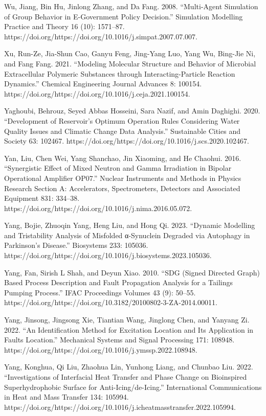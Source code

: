 \documentclass[utf8]{gradu3}
\begin{document}
Wu, Jiang, Bin Hu, Jinlong Zhang, and Da Fang. 2008. “Multi-Agent Simulation of Group Behavior in E-Government Policy Decision.” Simulation Modelling Practice and Theory 16 (10): 1571–87. https://doi.org/https://doi.org/10.1016/j.simpat.2007.07.007.

Xu, Run-Ze, Jia-Shun Cao, Ganyu Feng, Jing-Yang Luo, Yang Wu, Bing-Jie Ni, and Fang Fang. 2021. “Modeling Molecular Structure and Behavior of Microbial Extracellular Polymeric Substances through Interacting-Particle Reaction Dynamics.” Chemical Engineering Journal Advances 8: 100154. https://doi.org/https://doi.org/10.1016/j.ceja.2021.100154.

Yaghoubi, Behrouz, Seyed Abbas Hosseini, Sara Nazif, and Amin Daghighi. 2020. “Development of Reservoir’s Optimum Operation Rules Considering Water Quality Issues and Climatic Change Data Analysis.” Sustainable Cities and Society 63: 102467. https://doi.org/https://doi.org/10.1016/j.scs.2020.102467.

Yan, Liu, Chen Wei, Yang Shanchao, Jin Xiaoming, and He Chaohui. 2016. “Synergistic Effect of Mixed Neutron and Gamma Irradiation in Bipolar Operational Amplifier OP07.” Nuclear Instruments and Methods in Physics Research Section A: Accelerators, Spectrometers, Detectors and Associated Equipment 831: 334–38. https://doi.org/https://doi.org/10.1016/j.nima.2016.05.072.

Yang, Bojie, Zhuoqin Yang, Heng Liu, and Hong Qi. 2023. “Dynamic Modelling and Tristability Analysis of Misfolded α-Synuclein Degraded via Autophagy in Parkinson’s Disease.” Biosystems 233: 105036. https://doi.org/https://doi.org/10.1016/j.biosystems.2023.105036.

Yang, Fan, Sirish L Shah, and Deyun Xiao. 2010. “SDG (Signed Directed Graph) Based Process Description and Fault Propagation Analysis for a Tailings Pumping Process.” IFAC Proceedings Volumes 43 (9): 50–55. https://doi.org/https://doi.org/10.3182/20100802-3-ZA-2014.00011.

Yang, Jinsong, Jingsong Xie, Tiantian Wang, Jinglong Chen, and Yanyang Zi. 2022. “An Identification Method for Excitation Location and Its Application in Faults Location.” Mechanical Systems and Signal Processing 171: 108948. https://doi.org/https://doi.org/10.1016/j.ymssp.2022.108948.

Yang, Konghua, Qi Liu, Zhaohua Lin, Yunhong Liang, and Chunbao Liu. 2022. “Investigations of Interfacial Heat Transfer and Phase Change on Bioinspired Superhydrophobic Surface for Anti-Icing/de-Icing.” International Communications in Heat and Mass Transfer 134: 105994. https://doi.org/https://doi.org/10.1016/j.icheatmasstransfer.2022.105994.
\end{document}

